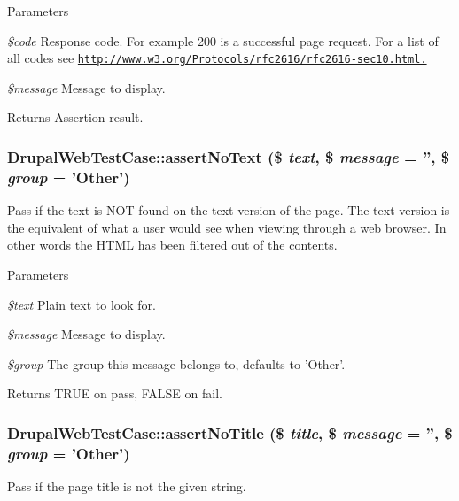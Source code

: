 \begin{DoxyParams}{Parameters}
\item[{\em \$code}]Response code. For example 200 is a successful page request. For a list of all codes see \href{http://www.w3.org/Protocols/rfc2616/rfc2616-sec10.html.}{\tt http://www.w3.org/Protocols/rfc2616/rfc2616-\/sec10.html.} \item[{\em \$message}]Message to display.\end{DoxyParams}
\begin{DoxyReturn}{Returns}
Assertion result. 
\end{DoxyReturn}
\hypertarget{classDrupalWebTestCase_aa2d5a43e1615b89589b7c8b2a2e4f487}{
\subsubsection[{assertNoText}]{\setlength{\rightskip}{0pt plus 5cm}DrupalWebTestCase::assertNoText (\$ {\em text}, \/  \$ {\em message} = {\ttfamily ''}, \/  \$ {\em group} = {\ttfamily 'Other'})}}
\label{classDrupalWebTestCase_aa2d5a43e1615b89589b7c8b2a2e4f487}
Pass if the text is NOT found on the text version of the page. The text version is the equivalent of what a user would see when viewing through a web browser. In other words the HTML has been filtered out of the contents.


\begin{DoxyParams}{Parameters}
\item[{\em \$text}]Plain text to look for. \item[{\em \$message}]Message to display. \item[{\em \$group}]The group this message belongs to, defaults to 'Other'. \end{DoxyParams}
\begin{DoxyReturn}{Returns}
TRUE on pass, FALSE on fail. 
\end{DoxyReturn}
\hypertarget{classDrupalWebTestCase_a629c2539df1b0958feb18b9bc83eb0fa}{
\subsubsection[{assertNoTitle}]{\setlength{\rightskip}{0pt plus 5cm}DrupalWebTestCase::assertNoTitle (\$ {\em title}, \/  \$ {\em message} = {\ttfamily ''}, \/  \$ {\em group} = {\ttfamily 'Other'})}}
\label{classDrupalWebTestCase_a629c2539df1b0958feb18b9bc83eb0fa}
Pass if the page title is not the given string.


